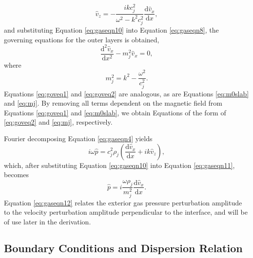 %
\begin{equation}
\label{eq:gaseqn10}
\hat v_z = - \frac{i k c_j^2}{\omega^2 - k^2 c_j^2} \frac{\mathrm{d} \hat v_x}{\mathrm{d} x},
\end{equation}
%
and substituting Equation \eqref{eq:gaseqn10} into Equation \eqref{eq:gaseqn8},  the governing equations for the outer layers is obtained,
%
\begin{equation}
\label{eq:goveq2}
\frac{\mathrm{d}^2 \hat v_x}{\mathrm{d} x^2} - m_j^2 \hat{v}_x = 0,
\end{equation}
%
where
%
\begin{equation}
\label{eq:mj}
m_j^2 = k^2 - \frac{\omega^2}{c_j^2}.
\end{equation}
%
Equations \eqref{eq:goveq1} and \eqref{eq:goveq2} are analogous, as are Equations \eqref{eq:m0slab} and \eqref{eq:mj}.
By removing all terms dependent on the magnetic field from Equations \eqref{eq:goveq1} and \eqref{eq:m0slab}, we obtain Equations of the form of \eqref{eq:goveq2} and \eqref{eq:mj}, respectively.

Fourier decomposing Equation \eqref{eq:gaseqn4} yields
%
\begin{equation}
\label{eq:gaseqn11}
i \omega \hat p
= c_j^2 \rho_j \left( \frac{\mathrm{d} \hat v_x}{\mathrm{d} x}
+ i k \hat v_z \right),
\end{equation}
%
which, after substituting Equation \eqref{eq:gaseqn10} into Equation \eqref{eq:gaseqn11}, becomes
%
\begin{equation}
\label{eq:gaseqn12}
\hat p
= i \frac{\omega \rho_j}{m_j^2} \frac{\mathrm{d} \hat v_x}{\mathrm{d} x}.
\end{equation}
%
Equation \eqref{eq:gaseqn12} relates the exterior gas pressure perturbation amplitude to the velocity perturbation amplitude perpendicular to the interface, and will be of use later in the derivation.



\subsection{Boundary Conditions and Dispersion Relation}
\label{subsec:disprel}

